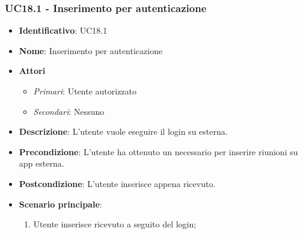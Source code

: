 \subsubsection{UC18.1 - Inserimento  per autenticazione }
\begin{itemize}
	\item \textbf{Identificativo}: UC18.1
	\item \textbf{Nome}: Inserimento  per autenticazione
	\item \textbf{Attori}
	\begin{itemize} 
		\item \textit{Primari}: Utente autorizzato
		\item \textit{Secondari}: Nessuno
	\end{itemize}
	\item \textbf{Descrizione}: L'utente vuole eseguire il login su  esterna.
	\item \textbf{Precondizione}: L'utente ha ottenuto un  necessario per inserire riunioni su app esterna.
	\item \textbf{Postcondizione}: L'utente inserisce  appena ricevuto.
	\item \textbf{Scenario principale}: \begin{enumerate}
		\item Utente inserisce  ricevuto a seguito del login; 
	\end{enumerate}
\end{itemize}